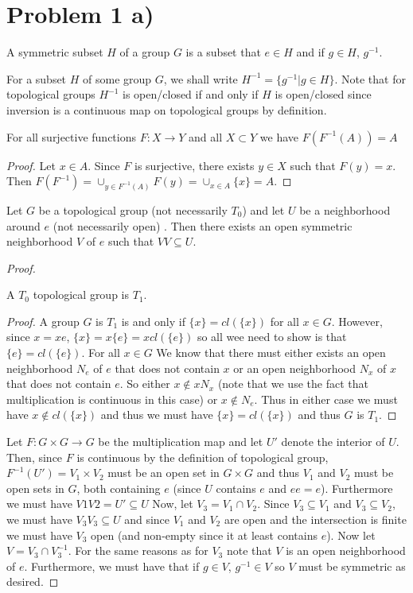 
\section*{Problem 1 a)}
\begin{mydef}
A symmetric subset $H$ of a group $G$ is a subset that $e\in H$ and if $g\in H$, $g^{-1}$.
\end{mydef}
\begin{notation}
For a subset $H$ of some group $G$, we shall write $H^{-1}=\{ g^{-1} | g\in H \}$. Note that for topological groups $H^{-1}$ is open/closed if and only if $H$ is open/closed since inversion is a continuous map on topological groups by definition.
\end{notation}
\begin{lemma}
For all surjective functions $F: X\to Y$ and all $X\subset Y$ we have $F(F^{-1}(A)) = A$
\begin{proof}
Let $x\in A$. Since $F$ is surjective, there exists $y\in X$ such that $F(y)=x$. Then $F(F^{-1})=\cup_{y\in F^{-1}(A)} F(y) = \cup_{x\in A} \{x\} = A$.
\end{proof}
\end{lemma} 
\begin{lemma}
Let $G$ be a topological group (not necessarily $T_0$) and let $U$ be a neighborhood around $e$ (not necessarily open) . Then there exists an open symmetric neighborhood $V$ of $e$ such that $VV\subseteq U$.
\begin{proof}
\begin{lemma}
A $T_0$ topological group is $T_1$.
\begin{proof}
A group $G$ is $T_1$ is and only if $\{x\} = cl(\{x\})$ for all $x\in G$. However, since $x=xe$, $\{x\} = x\{e\} = xcl(\{e\})$ so all wee need to show is that $\{e\} = cl(\{e\})$. For all $x\in G$ We know that there must either exists an open neighborhood $N_e$ of $e$ that does not contain $x$ or an open neighborhood $N_x$ of $x$ that does not contain $e$. So either $x\notin xN_x$  (note that we use the fact that multiplication is continuous in this case) or $x\notin N_e$. Thus in either case we must have $x\notin cl(\{x\})$ and thus we must have $\{x\}=cl(\{x\})$ and thus $G$ is $T_1$. 
\end{proof}
\end{lemma}
Let $F: G\times G \to G$ be the multiplication map and let $U'$ denote the interior of $U$. Then, since $F$ is continuous by the definition of topological group, $F^{-1}(U')=V_1\times V_2$ must be an open set in $G\times G$ and thus $V_1$ and $V_2$ must be open sets in $G$, both containing $e$ (since $U$ contains $e$ and $ee=e$). Furthermore we must have $V1V2=U'\subseteq U$ Now, let $V_3 = V_1\cap V_2$. Since $V_3\subseteq V_1$ and $V_3\subseteq V_2$, we must have $V_3V_3\subseteq U$ and since $V_1$ and $V_2$ are open and the intersection is finite we must have $V_3$ open (and non-empty since it at least contains $e$). Now let $V=V_3\cap V_3^{-1}$. For the same reasons as for $V_3$ note that $V$ is an open neighborhood of $e$. Furthermore, we must have that if $g\in V$, $g^{-1} \in V$ so $V$ must be symmetric as desired.
\end{proof}
\end{lemma}
